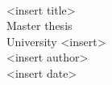 






 \begin{titlepage}
 	\mbox{}\vspace{5\baselineskip}\\
 	\sffamily\huge
 	\centering
 	<insert title>
 	\vspace{3\baselineskip}\\
 	\rmfamily\Large
 	Master thesis \\ University <insert>
 	\vspace{2\baselineskip}\\
 	\rmfamily\Large
 	<insert author>
 	\vspace{1\baselineskip}\\
 	<insert date>
 \end{titlepage}

% 
